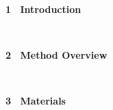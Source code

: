 \documentclass[portrait,a0,posterdraft]{a0poster} %
\def\exMinipage{782mm}
\def\exHalfMinipage{380mm}
\def\exSubHalfMinipage{369mm}
\begin{document}
{{{\begin{minipage}[t]{\exMinipage}
\begin{minipage}[t]{\exHalfMinipage}
\begin{minipage}[t]{\exHalfMinipage}%
\LARGE{\white \bf1 \ Introduction}\\[-10pt]
\begin{minipage}[t]{\exSubHalfMinipage}
\begin{mdframed}[style=smallframe]
\introtext
\end{mdframed}
\end{minipage} 
\end{minipage}%
\\[40pt]
\begin{minipage}[t]{\exHalfMinipage}%
\LARGE {\white  \bf 2 \ Method Overview}\\[-10pt]
\begin{minipage}[t]{\exSubHalfMinipage}
\begin{mdframed}[style=smallframe]
\methodtext
\end{mdframed}
\end{minipage}
\end{minipage}%
\\[40pt]
\begin{minipage}[t]{\exHalfMinipage}%
\LARGE { \white \bf 3 \ Materials}\\[-10pt]
\begin{minipage}[t]{\exSubHalfMinipage}
\begin{mdframed}[style=smallframe]
\materialstext
\end{mdframed}
\end{minipage}
\end{minipage}%
\\[40pt]
\end{minipage}%
\hspace{0.2cm}
\begin{minipage}[t]{\exHalfMinipage}


\end{minipage}
\end{minipage}}}}
\end{document}
